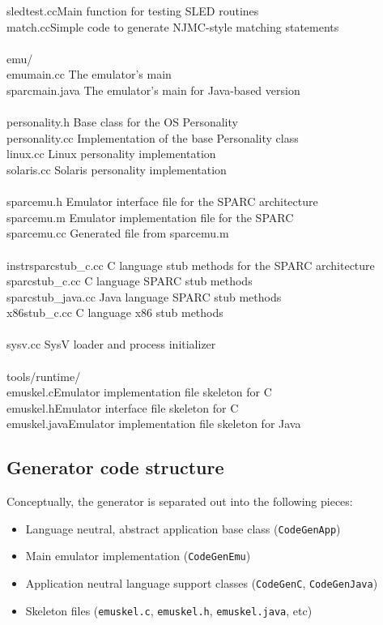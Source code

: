 \begin{tabbing}
  \>sledtest.cc\>Main function for testing SLED routines\\
  \>match.cc\>Simple code to generate NJMC-style matching statements\\
\\
emu/\\
	\>emumain.cc 		\>The emulator's main \\
	\>sparcmain.java	\>The emulator's main for Java-based version \\
\\
	\>personality.h		\>Base class for the OS Personality \\
	\>personality.cc	\>Implementation of the base Personality class \\
	\>linux.cc			\>Linux personality implementation \\
	\>solaris.cc		\>Solaris personality implementation \\
\\
	\>sparcemu.h		\>Emulator interface file for the SPARC architecture \\
	\>sparcemu.m		\>Emulator implementation file for the SPARC  \\
	\>sparcemu.cc		\>Generated file from sparcemu.m \\
\\
	\>instrsparcstub\_c.cc	\>C language stub methods for the SPARC architecture \\
	\>sparcstub\_c.cc	\>C language SPARC stub methods \\
	\>sparcstub\_java.cc \>Java language SPARC stub methods \\
	\>x86stub\_c.cc		\>C language x86 stub methods \\
\\
	\>sysv.cc			\>SysV loader and process initializer \\
\\
tools/runtime/\\
  \>emuskel.c\>Emulator implementation file skeleton for C \\
  \>emuskel.h\>Emulator interface file skeleton for C\\
  \>emuskel.java\>Emulator implementation file skeleton for Java\\
\end{tabbing}


\subsection{Generator code structure}

Conceptually, the generator is separated out into the following pieces:
\begin{itemize}
  \item Language neutral, abstract application base class (\texttt{CodeGenApp})
  \item Main emulator implementation (\texttt{CodeGenEmu})
  \item Application neutral language support classes (\texttt{CodeGenC}, 
		\texttt{CodeGenJava})
  \item Skeleton files (\texttt{emuskel.c}, \texttt{emuskel.h}, 
		\texttt{emuskel.java}, etc)
\end{itemize}

